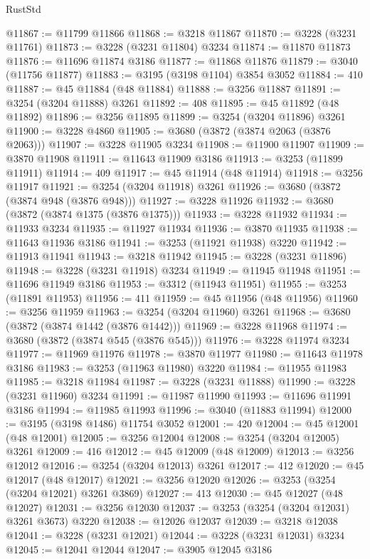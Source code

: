 \begin{lexlean}{RustStd}
\begin{coremodule}
@11867 := @11799 @11866
@11868 := @3218 @11867
@11870 := @3228 (@3231 @11761)
@11873 := @3228 (@3231 @11804) @3234
@11874 := @11870 @11873
@11876 := @11696 @11874 @3186
@11877 := @11868 @11876
@11879 := @3040 (@11756 @11877)
@11883 := @3195 (@3198 @1104) @3854 @3052
@11884 := 410
@11887 := @45 @11884 (@48 @11884)
@11888 := @3256 @11887
@11891 := @3254 (@3204 @11888) @3261
@11892 := 408
@11895 := @45 @11892 (@48 @11892)
@11896 := @3256 @11895
@11899 := @3254 (@3204 @11896) @3261
@11900 := @3228 @4860
@11905 := @3680 (@3872 (@3874 @2063 (@3876 @2063)))
@11907 := @3228 @11905 @3234
@11908 := @11900 @11907
@11909 := @3870 @11908
@11911 := @11643 @11909 @3186
@11913 := @3253 (@11899 @11911)
@11914 := 409
@11917 := @45 @11914 (@48 @11914)
@11918 := @3256 @11917
@11921 := @3254 (@3204 @11918) @3261
@11926 := @3680 (@3872 (@3874 @948 (@3876 @948)))
@11927 := @3228 @11926
@11932 := @3680 (@3872 (@3874 @1375 (@3876 @1375)))
@11933 := @3228 @11932
@11934 := @11933 @3234
@11935 := @11927 @11934
@11936 := @3870 @11935
@11938 := @11643 @11936 @3186
@11941 := @3253 (@11921 @11938) @3220
@11942 := @11913 @11941
@11943 := @3218 @11942
@11945 := @3228 (@3231 @11896)
@11948 := @3228 (@3231 @11918) @3234
@11949 := @11945 @11948
@11951 := @11696 @11949 @3186
@11953 := @3312 (@11943 @11951)
@11955 := @3253 (@11891 @11953)
@11956 := 411
@11959 := @45 @11956 (@48 @11956)
@11960 := @3256 @11959
@11963 := @3254 (@3204 @11960) @3261
@11968 := @3680 (@3872 (@3874 @1442 (@3876 @1442)))
@11969 := @3228 @11968
@11974 := @3680 (@3872 (@3874 @545 (@3876 @545)))
@11976 := @3228 @11974 @3234
@11977 := @11969 @11976
@11978 := @3870 @11977
@11980 := @11643 @11978 @3186
@11983 := @3253 (@11963 @11980) @3220
@11984 := @11955 @11983
@11985 := @3218 @11984
@11987 := @3228 (@3231 @11888)
@11990 := @3228 (@3231 @11960) @3234
@11991 := @11987 @11990
@11993 := @11696 @11991 @3186
@11994 := @11985 @11993
@11996 := @3040 (@11883 @11994)
@12000 := @3195 (@3198 @1486) @11754 @3052
@12001 := 420
@12004 := @45 @12001 (@48 @12001)
@12005 := @3256 @12004
@12008 := @3254 (@3204 @12005) @3261
@12009 := 416
@12012 := @45 @12009 (@48 @12009)
@12013 := @3256 @12012
@12016 := @3254 (@3204 @12013) @3261
@12017 := 412
@12020 := @45 @12017 (@48 @12017)
@12021 := @3256 @12020
@12026 := @3253 (@3254 (@3204 @12021) @3261 @3869)
@12027 := 413
@12030 := @45 @12027 (@48 @12027)
@12031 := @3256 @12030
@12037 := @3253 (@3254 (@3204 @12031) @3261 @3673) @3220
@12038 := @12026 @12037
@12039 := @3218 @12038
@12041 := @3228 (@3231 @12021)
@12044 := @3228 (@3231 @12031) @3234
@12045 := @12041 @12044
@12047 := @3905 @12045 @3186

\end{coremodule}
\end{lexlean}
